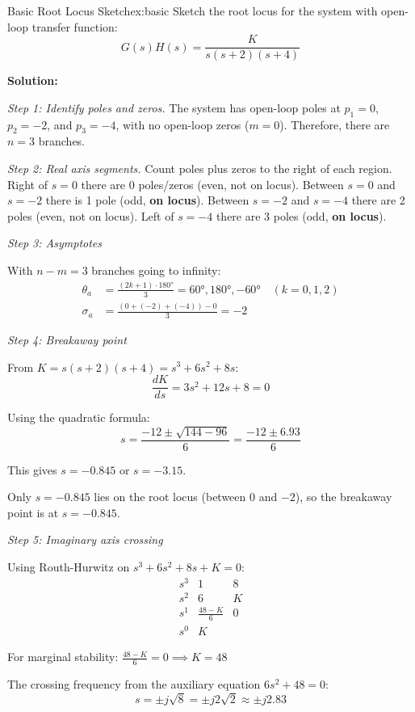 \begin{example}{Basic Root Locus Sketch}{ex:basic}
Sketch the root locus for the system with open-loop transfer function:
\[
G(s)H(s) = \frac{K}{s(s+2)(s+4)}
\]

\textbf{Solution:}

\textit{Step 1: Identify poles and zeros.} The system has open-loop poles at $p_1 = 0$, $p_2 = -2$, and $p_3 = -4$, with no open-loop zeros ($m = 0$). Therefore, there are $n = 3$ branches.

\textit{Step 2: Real axis segments.} Count poles plus zeros to the right of each region. Right of $s = 0$ there are 0 poles/zeros (even, not on locus). Between $s = 0$ and $s = -2$ there is 1 pole (odd, \textbf{on locus}). Between $s = -2$ and $s = -4$ there are 2 poles (even, not on locus). Left of $s = -4$ there are 3 poles (odd, \textbf{on locus}).

\textit{Step 3: Asymptotes}

With $n - m = 3$ branches going to infinity:
\begin{align*}
\theta_a &= \frac{(2k+1) \cdot 180°}{3} = 60°, 180°, -60° \quad (k = 0, 1, 2)\\
\sigma_a &= \frac{(0 + (-2) + (-4)) - 0}{3} = -2
\end{align*}

\textit{Step 4: Breakaway point}

From $K = s(s+2)(s+4) = s^3 + 6s^2 + 8s$:
\[
\frac{dK}{ds} = 3s^2 + 12s + 8 = 0
\]

Using the quadratic formula:
\[
s = \frac{-12 \pm \sqrt{144 - 96}}{6} = \frac{-12 \pm 6.93}{6}
\]

This gives $s = -0.845$ or $s = -3.15$.

Only $s = -0.845$ lies on the root locus (between 0 and $-2$), so the breakaway point is at $s = -0.845$.

\textit{Step 5: Imaginary axis crossing}

Using Routh-Hurwitz on $s^3 + 6s^2 + 8s + K = 0$:
\[
\begin{array}{c|cc}
s^3 & 1 & 8 \\
s^2 & 6 & K \\
s^1 & \frac{48-K}{6} & 0 \\
s^0 & K &
\end{array}
\]

For marginal stability: $\frac{48-K}{6} = 0 \implies K = 48$

The crossing frequency from the auxiliary equation $6s^2 + 48 = 0$:
\[
s = \pm j\sqrt{8} = \pm j2\sqrt{2} \approx \pm j2.83
\]


\end{example}
